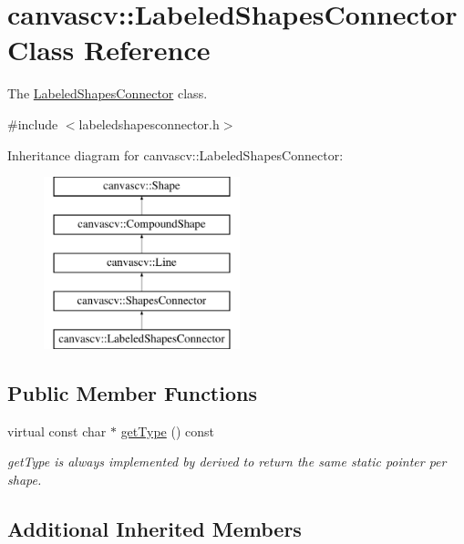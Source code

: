 \hypertarget{classcanvascv_1_1LabeledShapesConnector}{}\section{canvascv\+:\+:Labeled\+Shapes\+Connector Class Reference}
\label{classcanvascv_1_1LabeledShapesConnector}


The \hyperlink{classcanvascv_1_1LabeledShapesConnector}{Labeled\+Shapes\+Connector} class.  




{\ttfamily \#include $<$labeledshapesconnector.\+h$>$}

Inheritance diagram for canvascv\+:\+:Labeled\+Shapes\+Connector\+:\begin{figure}[H]
\begin{center}
\leavevmode
\includegraphics[height=5.000000cm]{classcanvascv_1_1LabeledShapesConnector}
\end{center}
\end{figure}
\subsection*{Public Member Functions}
\begin{DoxyCompactItemize}
\item 
virtual const char $\ast$ \hyperlink{classcanvascv_1_1LabeledShapesConnector_aebeccdf1e7c4efb0bde504b361eac801}{get\+Type} () const 
\begin{DoxyCompactList}\small\item\em get\+Type is always implemented by derived to return the same static pointer per shape. \end{DoxyCompactList}\end{DoxyCompactItemize}
\subsection*{Additional Inherited Members}


